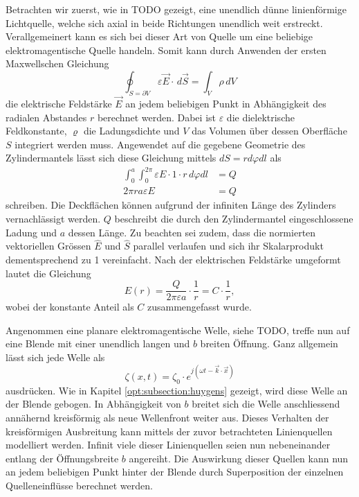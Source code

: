 Betrachten wir zuerst, wie in TODO gezeigt, eine unendlich dünne linienförmige Lichtquelle, welche sich axial in beide Richtungen unendlich weit erstreckt.
Verallgemeinert kann es sich bei dieser Art von Quelle um eine beliebige elektromagentische Quelle handeln.
Somit kann durch Anwenden der ersten Maxwellschen Gleichung
\begin{equation}
\oint_{S=\partial V} \varepsilon\vec{E} \cdot\, d\vec{S}
=
\int_{V}\rho\, dV
\end{equation}
die elektrische Feldstärke $\vec{E}$ an jedem beliebigen Punkt in Abhängigkeit des radialen Abstandes $r$ berechnet werden.
Dabei ist $\varepsilon$ die dielektrische Feldkonstante, $\varrho$ die Ladungsdichte und $V$ das Volumen über dessen Oberfläche $S$ integriert werden muss.
Angewendet auf die gegebene Geometrie des Zylindermantels lässt sich diese Gleichung mittels $dS = r d\varphi dl$ als
\begin{align}
\int_{0}^{a}\int_{0}^{2\pi} \varepsilon E\cdot 1 \cdot r\, d\varphi dl
&=
Q
\\
2\pi ra\varepsilon E
&=
Q
\end{align}
schreiben.
Die Deckflächen können aufgrund der infiniten Länge des Zylinders vernachlässigt werden.
$Q$ beschreibt die durch den Zylindermantel eingeschlossene Ladung und $a$ dessen Länge.
Zu beachten sei zudem, dass die normierten vektoriellen Grössen $\hat{E}$ und $\hat{S}$ parallel verlaufen und sich ihr Skalarprodukt dementsprechend zu 1 vereinfacht.
Nach der elektrischen Feldstärke umgeformt lautet die Gleichung
\begin{equation}
E(r)
=
\frac{Q}{2\pi\varepsilon a} \cdot \frac{1}{r}
=
C \cdot \frac{1}{r}
,
\label{opt:equation:E}
\end{equation}
wobei der konstante Anteil als $C$ zusammengefasst wurde.

Angenommen eine planare elektromagentische Welle, siehe TODO, treffe nun auf eine Blende mit einer unendlich langen und $b$ breiten Öffnung.
Ganz allgemein lässt sich jede Welle als
\begin{equation}
\zeta(x, t)
=
\zeta_0 \cdot e^{j(\omega t - \vec{k}\cdot\vec{x})}
\label{opt:equation:wave}
\end{equation}
ausdrücken.
Wie in Kapitel \ref{opt:subsection:huygens} gezeigt, wird diese Welle an der Blende gebogen.
In Abhängigkeit von $b$ breitet sich die Welle anschliessend annähernd kreisförmig als neue Wellenfront weiter aus.
Dieses Verhalten der kreisförmigen Ausbreitung kann mittels der zuvor betrachteten Linienquellen modelliert werden.
Infinit viele dieser Linienquellen seien nun nebeneinander entlang der Öffnungsbreite $b$ angereiht.
Die Auswirkung dieser Quellen kann nun an jedem beliebigen Punkt hinter der Blende durch Superposition der einzelnen Quelleneinflüsse berechnet werden.

